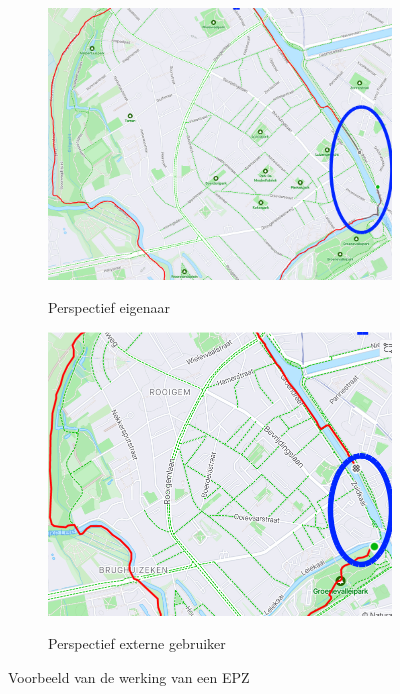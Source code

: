 \begin{figure}[h]
    \centering
    \begin{subfigure}[b]{.49\textwidth}
        \centering
        \caption{Perspectief eigenaar}
        \includegraphics[width=1\textwidth]{fig/EPZ-mechanisme/Example_EPZ_InternalView.png}\label{fig:EPZ_internal}
    \end{subfigure}\hfill
    \begin{subfigure}[b]{.49\textwidth}
        \centering
        \caption{Perspectief externe gebruiker}
        \includegraphics[width=1\textwidth]{fig/EPZ-mechanisme/Example_EPZ_ExternalView.png}\label{fig:EPZ_external}
    \end{subfigure}
    \caption{Voorbeeld van de werking van een \ac{EPZ}}\label{fig:EPZ_Voorbeeld}
\end{figure}


